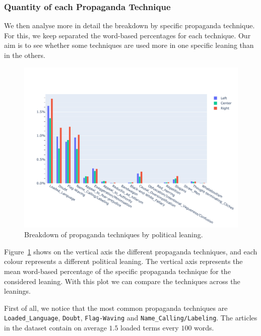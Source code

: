 \subsubsection{Quantity of each Propaganda Technique}
We then analyse more in detail the breakdown by specific propaganda technique. For this, we keep separated the word-based percentages for each technique.
Our aim is to see whether some techniques are used more in one specific leaning than in the others.


\begin{figure}[!htbp]
    \centering
    \includegraphics[trim={0 0 0 2cm},clip,width=\linewidth]{figures/prop_tech_detail_across_leaning_baly.pdf}
    \caption{Breakdown of propaganda techniques by political leaning.}
    \label{fig:prop_tech_details_across_leaning}
\end{figure}

Figure~\ref{fig:prop_tech_details_across_leaning} shows on the vertical axis the different propaganda techniques, and each colour represents a different political leaning. The vertical axis represents the mean word-based percentage of the specific propaganda technique for the considered leaning.
With this plot we can compare the techniques across the leanings.

First of all, we notice that the most common propaganda techniques are \texttt{Loaded\_Language}, \texttt{Doubt}, \texttt{Flag-Waving} and \texttt{Name\_Calling/Labeling}.
The articles in the dataset contain on average $1.5$ loaded terms every $100$ words.

